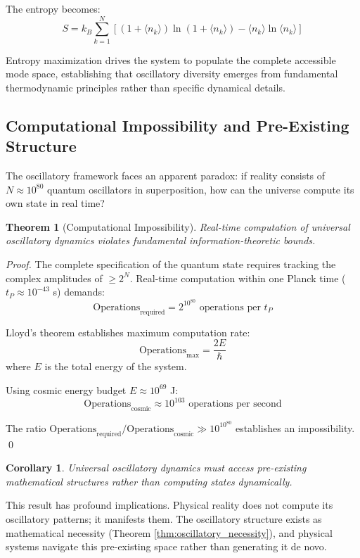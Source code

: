 \documentclass[12pt,a4paper]{article}
\newtheorem{corollary}{Corollary}
\newtheorem{theorem}{Theorem}
\begin{document}
The entropy becomes:
$$S = k_B \sum_{k=1}^{N} \left[(1 + \langle n_k\rangle)\ln(1 + \langle n_k\rangle) - \langle n_k\rangle\ln\langle n_k\rangle\right]$$

Entropy maximization drives the system to populate the complete accessible mode space, establishing that oscillatory diversity emerges from fundamental thermodynamic principles rather than specific dynamical details.

\subsection{Computational Impossibility and Pre-Existing Structure}

The oscillatory framework faces an apparent paradox: if reality consists of $N \approx 10^{80}$ quantum oscillators in superposition, how can the universe compute its own state in real time?

\begin{theorem}[Computational Impossibility]
Real-time computation of universal oscillatory dynamics violates fundamental information-theoretic bounds.
\end{theorem}

\begin{proof}
The complete specification of the quantum state requires tracking the complex amplitudes of $\geq 2^N$. Real-time computation within one Planck time ($t_P \approx 10^{-43}$ s) demands:
$$\text{Operations}_{\text{required}} = 2^{10^{80}} \text{ operations per } t_P$$

Lloyd's theorem establishes maximum computation rate:
$$\text{Operations}_{\text{max}} = \frac{2E}{\hbar}$$
where $E$ is the total energy of the system.

Using cosmic energy budget $E \approx 10^{69}$ J:
$$\text{Operations}_{\text{cosmic}} \approx 10^{103} \text{ operations per second}$$

The ratio $\text{Operations}_{\text{required}}/\text{Operations}_{\text{cosmic}} \gg 10^{10^{80}}$ establishes an impossibility. \qed
\end{proof}

\begin{corollary}
Universal oscillatory dynamics must access pre-existing mathematical structures rather than computing states dynamically.
\end{corollary}

This result has profound implications. Physical reality does not compute its oscillatory patterns; it manifests them. The oscillatory structure exists as mathematical necessity (Theorem \ref{thm:oscillatory_necessity}), and physical systems navigate this pre-existing space rather than generating it de novo.
\end{document}
